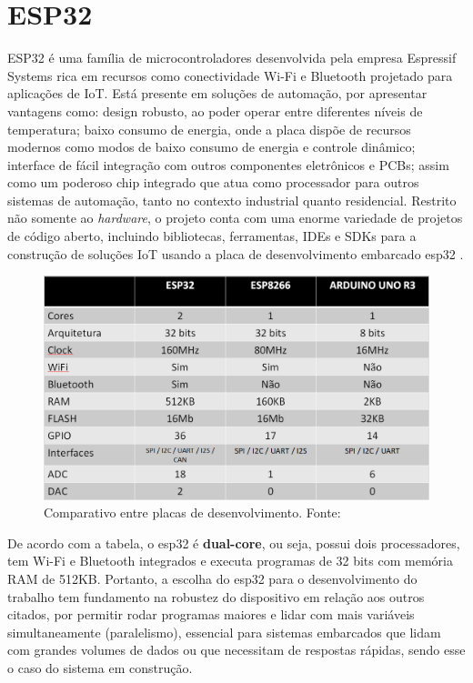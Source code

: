 \section{ESP32}

ESP32 é uma família de microcontroladores desenvolvida pela empresa Espressif Systems rica em recursos como conectividade Wi-Fi e Bluetooth projetado para aplicações de IoT. 
Está presente em soluções de automação, por apresentar vantagens como: design robusto, ao poder operar entre diferentes níveis de temperatura; 
baixo consumo de energia, onde a placa dispõe de recursos modernos como modos de baixo consumo de energia e controle dinâmico; interface de fácil 
integração com outros componentes eletrônicos e PCBs; assim como um poderoso chip integrado que atua como processador para outros sistemas de automação, 
tanto no contexto industrial quanto residencial. Restrito não somente ao \textit{hardware}, o projeto conta com uma enorme variedade 
de projetos de código aberto, incluindo bibliotecas, ferramentas, IDEs e SDKs para a construção de soluções IoT usando a placa de desenvolvimento embarcado esp32 \cite{esp32-espressif-documentation}. 

\begin{figure}[ht]
    \centering
    \includegraphics[width=.57\textwidth]{img/esp32-comparation-table.png}
    \caption{Comparativo entre placas de desenvolvimento. Fonte:\cite{esp32-comparation-table}}\label{figTableEsp}
\end{figure}

De acordo com a tabela, o esp32 é \textbf{dual-core}, ou seja, possui dois processadores, tem Wi-Fi e Bluetooth 
integrados e executa programas de 32 bits com memória RAM de 512KB. Portanto, a escolha do esp32 para o desenvolvimento 
do trabalho tem fundamento na robustez do dispositivo em relação aos outros citados, por permitir rodar programas maiores e lidar com mais variáveis simultaneamente (paralelismo), 
essencial para sistemas embarcados que lidam com grandes volumes de dados ou que necessitam de respostas rápidas, sendo esse o caso do sistema em construção. 

